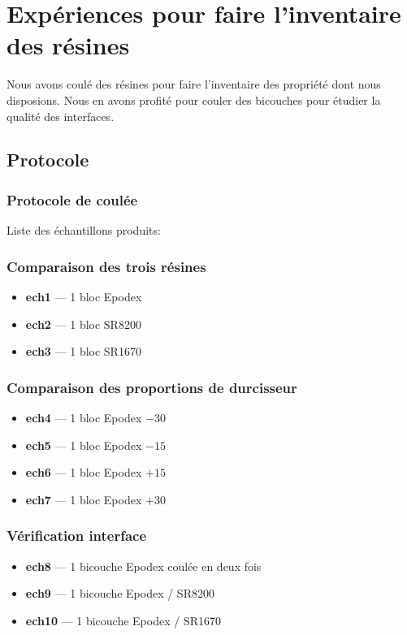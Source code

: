 \section{Expériences pour faire l'inventaire des résines}
Nous avons coulé des résines pour faire l'inventaire des propriété dont nous disposions. Nous en avons profité pour couler des bicouches pour étudier la qualité des interfaces. 

\subsection{Protocole}
\subsubsection{Protocole de coulée}


Liste des échantillons produits:
\subsubsection*{Comparaison des trois résines}
\begin{itemize}
	\item \textbf{ech1} — 1 bloc Epodex
	\item \textbf{ech2} — 1 bloc SR8200
	\item \textbf{ech3} — 1 bloc SR1670
\end{itemize}

\subsubsection*{Comparaison des proportions de durcisseur}
\begin{itemize}
	\item \textbf{ech4} — 1 bloc Epodex \(-30\)
	\item \textbf{ech5} — 1 bloc Epodex \(-15\)
	\item \textbf{ech6} — 1 bloc Epodex \(+15\)
	\item \textbf{ech7} — 1 bloc Epodex \(+30\)
\end{itemize}

\subsubsection*{Vérification interface}
\begin{itemize}
	\item \textbf{ech8} — 1 bicouche Epodex coulée en deux fois
	\item \textbf{ech9} — 1 bicouche Epodex / SR8200
	\item \textbf{ech10} — 1 bicouche Epodex / SR1670
\end{itemize}

